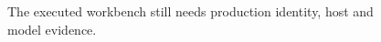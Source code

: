 \begin{figure}[H]
\centering
{}
\caption{The executed workbench still needs production identity, host and model evidence.}\label{fig:gap-execution-limits}
\end{figure}

